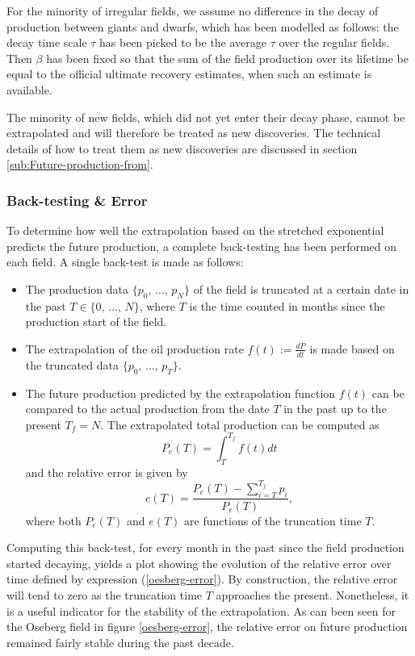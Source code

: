 \documentclass[review]{elsarticle}
\begin{document}
For the minority of irregular fields, we assume 
no difference in the decay of production between giants and dwarfs, which
has been modelled as follows: the decay time scale $\tau$ has been picked to be the average $\tau$ over
the regular fields. Then $\beta$ has been fixed so that the sum of
the field production over its lifetime be equal
to the official ultimate recovery estimates, when such an estimate
is available.

The minority of new fields, which did not yet enter their decay phase,
cannot be extrapolated and will therefore be treated as new discoveries.
The technical details of how to treat them as new discoveries are
discussed in section \ref{sub:Future-production-from}.


\subsubsection{Back-testing \& Error}

To determine how well the extrapolation based on the stretched exponential
predicts the future production, a complete back-testing has been performed
on each field. A single back-test is made as follows:
\begin{itemize}
\item The production data $\{p_{0},\,\ldots,\, p_{N}\}$ of the field is
truncated at a certain date in the past $T \in\{0,\,\ldots,\, N\}$, where
$T$ is the time counted in months since the production start of the field.
\item The extrapolation of the oil production rate
$f(t) := \frac{dP}{dt}$ is made based on the truncated data $\{p_{0},\,\ldots,\, p_{T}\}$.
\item The future production predicted by the extrapolation function $f(t)$ can be
compared to the actual production from the date $T$ in the past
up to the present $T_{f}=N$. The extrapolated total production can be
computed as 
\begin{equation}
P_{e}(T)=\int_{T}^{T_{f}}f(t)dt
\end{equation}
and the relative error is given by
\begin{equation}
e(T)=\frac{P_{e}(T)-\sum_{i=T}^{T_{f}}p_{i}}{P_{e}(T)},
\label{ryjryukoik}
\end{equation}
where both $P_{e}(T)$ and $e(T)$ are functions of the truncation time $T$.
\end{itemize}
Computing this back-test, for every month in the past since the field production
started decaying, yields a plot showing the evolution of the relative
error over time defined by expression (\ref{oesberg-error}). By construction, the relative
error will tend to zero as the truncation time $T$ approaches the
present. Nonetheless, it is a useful indicator for the stability of
the extrapolation. As can been seen for the Oseberg field in figure \ref{oesberg-error}, the relative
error on future production remained fairly stable during the past
decade.
\end{document}
